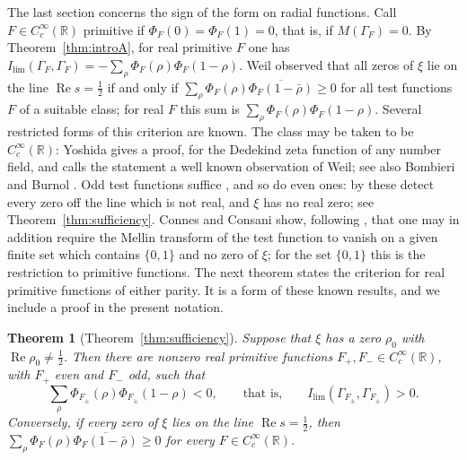 \documentclass[11pt]{amsart}
\newtheorem{theorem}{Theorem}[section]
\theoremstyle{remark}
\numberwithin{equation}{section}
\newcommand{\R}{\mathbb R}
\newcommand{\Rel}{\operatorname{Re}}
\newcommand{\Il}{I_{\lim}}
\begin{document}
The last section concerns the sign of the form on radial functions.  Call
$F\in C_c^\infty(\R)$ primitive if $\Phi_F(0)=\Phi_F(1)=0$, that is, if
$M(\Gamma_F)=0$.  By Theorem~\ref{thm:introA}, for real primitive $F$ one has
$\Il(\Gamma_F,\Gamma_F)=-\sum_\rho\Phi_F(\rho)\Phi_F(1-\rho)$.  Weil
\cite{Weil1952} observed that all zeros of $\xi$ lie on the line
$\Rel s=\frac12$ if and only if
$\sum_\rho\Phi_F(\rho)\overline{\Phi_F(1-\bar\rho)}\ge0$ for all test
functions $F$ of a suitable class; for real $F$ this sum is
$\sum_\rho\Phi_F(\rho)\Phi_F(1-\rho)$.  Several restricted forms of this
criterion are known.  The class may be taken to be $C_c^\infty(\R)$: Yoshida
\cite[Lemma~1 and Proposition~1]{Yoshida} gives a proof, for the Dedekind
zeta function of any number field, and calls the statement a well known
observation of Weil; see also Bombieri \cite{Bombieri} and Burnol
\cite{BurnolCR}.  Odd test functions suffice
\cite[Proposition~1(1)]{Yoshida}, and so do even ones: by
\cite[Proposition~1(2)]{Yoshida} these detect every zero off the line which
is not real, and $\xi$ has no real zero; see
Theorem~\ref{thm:sufficiency}.  Connes and Consani
\cite[Proposition~C.1]{CCWeilArch} show, following \cite{Yoshida}, that one
may in addition require the Mellin transform of the test function to vanish
on a given finite set which contains $\{0,1\}$ and no zero of $\xi$; for the
set $\{0,1\}$ this is the restriction to primitive functions.  The next
theorem states the criterion for real primitive functions of either parity.
It is a form of these known results, and we include a proof in the present
notation.

\begin{theorem}[Theorem~\ref{thm:sufficiency}]
\label{thm:introC}
Suppose that $\xi$ has a zero $\rho_0$ with $\Rel\rho_0\ne\frac12$.  Then
there are nonzero real primitive functions $F_+,F_-\in C_c^\infty(\R)$, with
$F_+$ even and $F_-$ odd, such that
\[
  \sum_\rho\Phi_{F_\pm}(\rho)\Phi_{F_\pm}(1-\rho)<0,\qquad\text{that is,}\qquad
  \Il(\Gamma_{F_\pm},\Gamma_{F_\pm})>0 .
\]
Conversely, if every zero of $\xi$ lies on the line $\Rel s=\frac12$, then
$\sum_\rho\Phi_F(\rho)\overline{\Phi_F(1-\bar\rho)}\ge0$ for every
$F\in C_c^\infty(\R)$.
\end{theorem}
\end{document}
